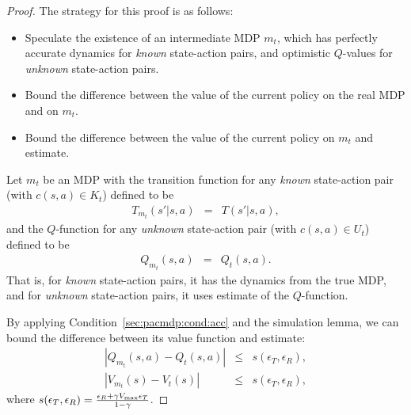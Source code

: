 \begin{proof}

The strategy for this proof is as follows:
\begin{itemize}
\item Speculate the existence of an intermediate MDP $m_t$, which has perfectly accurate dynamics for \emph{known} state-action pairs, and optimistic $Q$-values for \emph{unknown} state-action pairs.
\item Bound the difference between the value of the current policy on the real MDP and on $m_t$.
\item Bound the difference between the value of the current policy on $m_t$ and \As estimate.
\end{itemize}

Let $m_t$ be an MDP with the transition function for any \emph{known} state-action pair (with $c(s,a) \in K_t$) defined to be
\begin{eqnarray}
T_{m_t}(s'|s,a) &=& T(s'|s,a),
\end{eqnarray}
and the $Q$-function for any \emph{unknown} state-action pair (with $c(s,a) \in U_t$) defined to be
\begin{eqnarray}
Q_{m_t}(s,a) &=& Q_t(s,a).
\end{eqnarray}
That is, for \emph{known} state-action pairs, it has the dynamics from the true MDP, and for \emph{unknown} state-action pairs, it uses \As estimate of the $Q$-function.

By applying Condition~\ref{sec:pacmdp:cond:acc} and the simulation lemma, we can bound the difference between its value function and \As estimate:
\begin{eqnarray}
|Q_{m_t}(s,a) - Q_t(s,a)| &\leq& s(\epsilon_T,\epsilon_R),\\
|V_{m_t}(s) - V_t(s)| &\leq& s(\epsilon_T,\epsilon_R),
\end{eqnarray}
where $s(\epsilon_T,\epsilon_R) = \frac{ \epsilon_R + \gamma V_{\rm max}\epsilon_T }{1-\gamma}$.


\end{proof}
